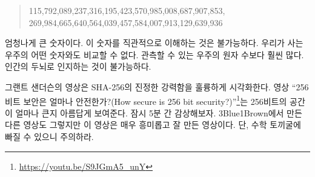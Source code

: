 \begin{comment}
	\begin{quotation}\begin{samepage}
			115 quattuorvigintillion 792 trevigintillion 89 duovigintillion 237
			unvigintillion 316 vigintillion 195 novemdecillion 423 octodecillion 570
			septendecillion 985 sexdecillion 8 quindecillion 687 quattuordecillion 907
			tredecillion 853 duodecillion 269 undecillion 984 decillion 665 nonillion
			640 octillion 564 septillion 39 sextillion 457 quintillion 584 quadrillion 7
			trillion 913 billion 129 million 639 thousand 936.
	\end{samepage}\end{quotation}
\end{comment}
\begin{quotation}
	\begin{samepage}
		115,792,089,237,316,195,423,570,985,008,687,907,853,
		269,984,665,640,564,039,457,584,007,913,129,639,936
	\end{samepage}
\end{quotation}

\begin{comment}
	That's a lot of nonillions! Wrapping your head around this number is
	pretty much impossible. There is nothing in the physical universe to
	compare it to. It is far larger than the number of atoms in the
	observable universe. The human brain simply isn't made to make sense of
	it.
\end{comment}
엄청나게 큰 숫자이다. 이 숫자를 직관적으로 이해하는 것은 불가능하다. 
우리가 사는 우주의 어떤 숫자와도 비교할 수 없다.
관측할 수 있는 우주의 원자 수보다 훨씬 많다. 
인간의 두뇌로 인지하는 것이 불가능하다.

\newpage

\begin{comment}
	One of the best visualizations of the true strength of SHA-256 is a video by
	Grant Sanderson. Aptly named \textit{\enquote{How secure is 256 bit
			security?}}\footnote{Watch the video at \url{https://youtu.be/S9JGmA5_unY}} it
	beautifully shows how large a 256-bit space is. Do yourself a favor and take the
	five minutes to watch it. As all other \textit{3Blue1Brown} videos it is not
	only fascinating but also exceptionally well made. Warning: You might fall down
	a math rabbit hole.
\end{comment}
그랜트 샌더슨의 영상은 SHA-256의 진정한 강력함을 훌륭하게 시각화한다.
영상 \enquote{256비트 보안은 얼마나 안전한가?(How secure is 256 bit
	security?)}\footnote{\url{https://youtu.be/S9JGmA5_unY}}는
256비트의 공간이 얼마나 큰지 아름답게 보여준다. 잠시 5분 간 감상해보자.
3Blue1Brown에서 만든 다른 영상도 그렇지만 이 영상은 매우 흥미롭고 잘 만든 영상이다.
단, 수학 토끼굴에 빠질 수 있으니 주의하라.

